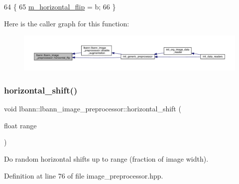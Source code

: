 \begin{DoxyCode}
64                                \{
65     \hyperlink{classlbann_1_1lbann__image__preprocessor_a032397d6c642dccd43f4c38393f5d2c1}{m\_horizontal\_flip} = b;
66   \}
\end{DoxyCode}
Here is the caller graph for this function\+:\nopagebreak
\begin{figure}[H]
\begin{center}
\leavevmode
\includegraphics[width=350pt]{classlbann_1_1lbann__image__preprocessor_a4ba2de0a781dfa0a2652ad4d777a241f_icgraph}
\end{center}
\end{figure}
\mbox{\label{classlbann_1_1lbann__image__preprocessor_ae62596b4af5d1940aa0499cde2bdd005}} 
\subsubsection{\texorpdfstring{horizontal\+\_\+shift()}{horizontal\_shift()}}
{\footnotesize\ttfamily void lbann\+::lbann\+\_\+image\+\_\+preprocessor\+::horizontal\+\_\+shift (\begin{DoxyParamCaption}\item[{float}]{range }\end{DoxyParamCaption})\hspace{0.3cm}{\ttfamily [inline]}}

Do random horizontal shifts up to range (fraction of image width). 

Definition at line 76 of file image\+\_\+preprocessor.\+hpp.


